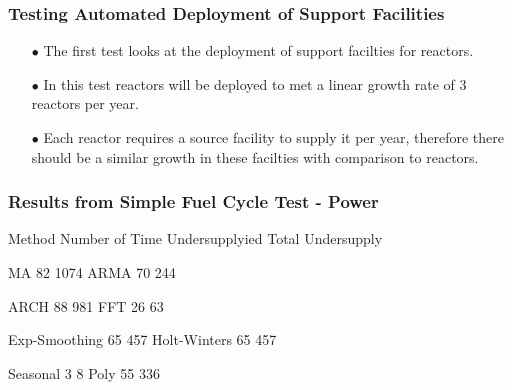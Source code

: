 \begin{frame}
  \frametitle{Testing Automated Deployment of Support Facilities}
  \begin{itemize}
      \item[$\bullet$] The first test looks at the deployment of support
                       facilties for reactors. 
      \item[$\bullet$] In this test reactors will be deployed to met a linear
                       growth rate of 3 reactors per year. 
      \item[$\bullet$] Each reactor requires a source facility to supply it
                       per year, therefore there should be a similar growth
                       in these facilties with comparison to reactors. 
   \end{itemize}        
\end{frame}

\begin{frame}
  \frametitle{Results from Simple Fuel Cycle Test - Power}
        Method      Number of Time Undersupplyied   Total Undersupply
        \begin{block}{MA        82      1074}
        ARMA        70      244
        \end{block}
        \begin{block}{ARCH        88      981}
        FFT        26      63
        \end{block}
        \begin{block}{Exp-Smoothing        65      457}
        Holt-Winters        65      457
        \end{block}
        \begin{block}{Seasonal        3      8}
        Poly        55      336
        \end{block}
\end{frame}
